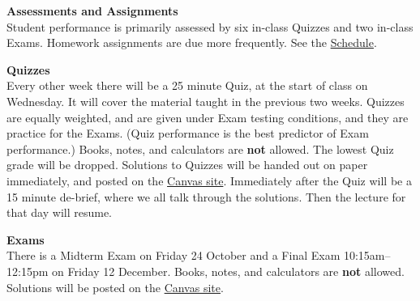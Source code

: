 \documentclass[12pt]{article}
\renewcommand{\emph}[1]{\textsf{\textbf{#1}}}
\newcommand{\localhead}[1]{\par\smallskip\textbf{#1}\nobreak\\}%
\def\heading#1{\localhead{\large\emph{#1}}}
\def\subheading#1{\localhead{\emph{#1}}}
\begin{document}
\heading{Assessments and Assignments}
Student performance is primarily assessed by six in-class Quizzes and two in-class Exams.  Homework assignments are due more frequently.  See the \href{https://blackcurrantpi.github.io/ode/assets/general/F25/schedule.pdf}{Schedule}.
 

\subheading{Quizzes}%
Every other week there will be a 25 minute Quiz, at the start of class on Wednesday.  It will cover the material taught in the previous two weeks.  Quizzes are equally weighted, and are given under Exam testing conditions, and they are practice for the Exams.  (Quiz performance is the best predictor of Exam performance.)  Books, notes, and calculators are \emph{not} allowed.  The lowest Quiz grade will be dropped.  Solutions to Quizzes will be handed out on paper immediately, and posted on the \href{https://canvas.alaska.edu/courses/27085}{Canvas site}.  Immediately after the Quiz will be a 15 minute de-brief, where we all talk through the solutions.  Then the lecture for that day will resume.


\subheading{Exams}
There is a Midterm Exam on Friday 24 October and a Final Exam 10:15am--12:15pm on Friday 12 December.   Books, notes, and calculators are \emph{not} allowed.  Solutions will be posted on the \href{https://canvas.alaska.edu/courses/27085}{Canvas site}.
\end{document}
